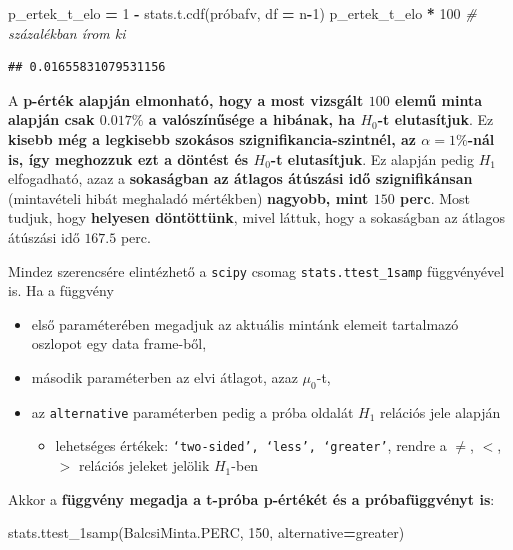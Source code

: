 \documentclass[
]{book}
\newenvironment{Shaded}{\begin{snugshade}}{\end{snugshade}}
\newcommand{\CommentTok}[1]{\textcolor[rgb]{0.56,0.35,0.01}{\textit{#1}}}
\newcommand{\DecValTok}[1]{\textcolor[rgb]{0.00,0.00,0.81}{#1}}
\newcommand{\NormalTok}[1]{#1}
\newcommand{\OperatorTok}[1]{\textcolor[rgb]{0.81,0.36,0.00}{\textbf{#1}}}
\newcommand{\StringTok}[1]{\textcolor[rgb]{0.31,0.60,0.02}{#1}}
\providecommand{\tightlist}{%
  \setlength{\itemsep}{0pt}\setlength{\parskip}{0pt}}
\begin{document}
\begin{Shaded}
\begin{Highlighting}[]
\NormalTok{p\_ertek\_t\_elo }\OperatorTok{=} \DecValTok{1} \OperatorTok{{-}}\NormalTok{ stats.t.cdf(próbafv, df }\OperatorTok{=}\NormalTok{ n}\OperatorTok{{-}}\DecValTok{1}\NormalTok{)}
\NormalTok{p\_ertek\_t\_elo }\OperatorTok{*} \DecValTok{100} \CommentTok{\# százalékban írom ki}
\end{Highlighting}
\end{Shaded}

\begin{verbatim}
## 0.01655831079531156
\end{verbatim}

A \textbf{p-érték alapján elmonható, hogy a most vizsgált \(100\) elemű minta alapján csak \(0.017\%\) a valószínűsége a hibának, ha \(H_0\)-t elutasítjuk}. Ez \textbf{kisebb még a legkisebb szokásos szignifikancia-szintnél, az \(\alpha=1\%\)-nál is, így meghozzuk ezt a döntést és \(H_0\)-t elutasítjuk}.
Ez alapján pedig \(H_1\) elfogadható, azaz a \textbf{sokaságban az átlagos átúszási idő szignifikánsan} (mintavételi hibát meghaladó mértékben) \textbf{nagyobb, mint \(150\) perc}.
Most tudjuk, hogy \textbf{helyesen döntöttünk}, mivel láttuk, hogy a sokaságban az átlagos átúszási idő \(167.5\) perc.

Mindez szerencsére elintézhető a \texttt{scipy} csomag \texttt{stats.ttest\_1samp} függvényével is. Ha a függvény

\begin{itemize}
\tightlist
\item
  első paraméterében megadjuk az aktuális mintánk elemeit tartalmazó oszlopot egy data frame-ből,
\item
  második paraméterben az elvi átlagot, azaz \(\mu_0\)-t,
\item
  az \texttt{alternative} paraméterben pedig a próba oldalát \(H_1\) relációs jele alapján

  \begin{itemize}
  \tightlist
  \item
    lehetséges értékek: \texttt{‘two-sided’,\ ‘less’,\ ‘greater’}, rendre a \(\neq\), \(<\), \(>\) relációs jeleket jelölik \(H_1\)-ben
  \end{itemize}
\end{itemize}

Akkor a \textbf{függvény megadja a t-próba p-értékét és a próbafüggvényt is}:

\begin{Shaded}
\begin{Highlighting}[]
\NormalTok{stats.ttest\_1samp(BalcsiMinta.PERC, }\DecValTok{150}\NormalTok{, alternative}\OperatorTok{=}\StringTok{\textquotesingle{}greater\textquotesingle{}}\NormalTok{)}
\end{Highlighting}
\end{Shaded}
\end{document}
